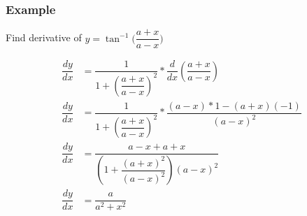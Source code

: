 \documentclass[t]{beamer}
\theoremstyle{plain}
\theoremstyle{definition}
\begin{document}
\frame
{
	\frametitle{Example}
	Find derivative of $y = \tan^{-1}\big(\dfrac{a + x}{a - x}\big)$ 
	
	\vspace{0.5em}
	
	\begin{align*}
  	\dfrac{dy}{dx}&= \dfrac{1}{1 + (\dfrac{a+x}{a-x})^2} * \dfrac{d}{dx} (\dfrac{a + x}{a - x})\\
  	\dfrac{dy}{dx}&= \dfrac{1}{1 + (\dfrac{a+x}{a-x})^2} * \dfrac{(a-x)*1 - (a+x)(-1)}{(a-x)^2}\\
  	\dfrac{dy}{dx}&= \dfrac{a - x + a + x}{(1 + \dfrac{(a + x)^2}{(a - x)^2})(a-x)^2}\\
  	\dfrac{dy}{dx}&= \dfrac{a}{a^2 + x^2}\\
	\end{align*}	
	
}
\end{document}
